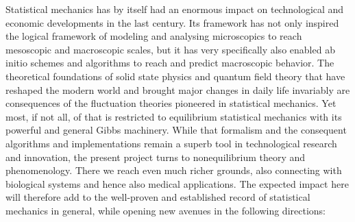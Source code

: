 Statistical mechanics has by itself had an enormous impact on technological and economic
developments in the last century. Its framework has not only inspired the logical framework
of modeling and analysing microscopics to reach mesoscopic and macroscopic scales, but it
has very specifically also enabled ab initio schemes and algorithms to reach and predict
macroscopic behavior.
%
The theoretical foundations of solid state physics and quantum field theory that have reshaped the
modern world and brought major changes in daily life invariably are consequences of the
fluctuation theories pioneered in statistical mechanics. Yet most, if not all, of that is
restricted to equilibrium statistical mechanics with its powerful and general Gibbs
machinery.
%
While that formalism and the consequent algorithms and implementations remain a superb tool
in technological research and innovation, the present project turns to nonequilibrium theory
and phenomenology. There we reach even much richer grounds, also connecting with biological
systems and hence also medical applications. The expected impact here will therefore add to
the well-proven and established record of statistical mechanics in general, while opening
new avenues in the following directions:
